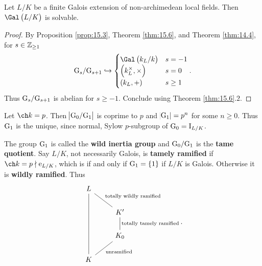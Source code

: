 
\begin{corollary}
Let $ L / K $ be a finite Galois extension of non-archimedean local fields. Then $ \Gal\br{L / K} $ is solvable.
\end{corollary}

\begin{proof}
By Proposition \ref{prop:15.3}, Theorem \ref{thm:15.6}, and Theorem \ref{thm:14.4}, for $ s \in \mathbb{Z}_{\ge 1} $
$$ \G_s / \G_{s + 1} \hookrightarrow
\begin{cases}
\Gal\br{k_L / k} & s = -1 \\
\br{k_L^\times, \times} & s = 0 \\
\br{k_L, +} & s \ge 1
\end{cases}.
$$
Thus $ \mathrm{G}_s / \mathrm{G}_{s + 1} $ is abelian for $ s \ge -1 $. Conclude using Theorem \ref{thm:15.6}.$ 2 $.
\end{proof}

Let $ \ch k = p $. Then $ \abs{\mathrm{G}_0 / \mathrm{G}_1} $ is coprime to $ p $ and $ \abs{\mathrm{G}_1} = p^n $ for some $ n \ge 0 $. Thus $ \mathrm{G}_1 $ is the unique, since normal, Sylow $ p $-subgroup of $ \mathrm{G}_0 = \mathrm{I}_{L / K} $.

\begin{definition}
The group $ \mathrm{G}_1 $ is called the \textbf{wild inertia group} and $ \mathrm{G}_0 / \mathrm{G}_1 $ is the \textbf{tame quotient}. Say $ L / K $, not necessarily Galois, is \textbf{tamely ramified} if $ \ch k = p \nmid \e_{L / K} $, which is if and only if $ \G_1 = \cbr{1} $ if $ L / K $ is Galois. Otherwise it is \textbf{wildly ramified}. Thus
$$
\begin{tikzcd}
L \arrow[dash]{dr}{\text{totally wildly ramified}} \arrow[dash]{ddd} & \\
& K' \arrow[dash]{d}{\text{totally tamely ramified}} \\
& K_0 \arrow[dash]{dl}{\text{unramified}} \\
K &
\end{tikzcd}.
$$
\end{definition}

\pagebreak

